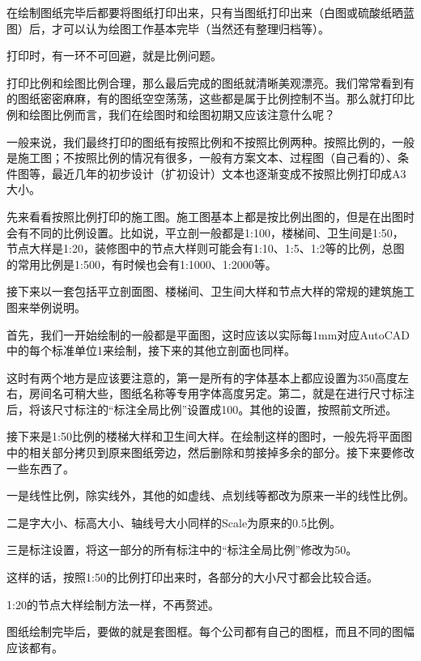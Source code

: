 在绘制图纸完毕后都要将图纸打印出来，只有当图纸打印出来（白图或硫酸纸晒蓝图）后，才可以认为绘图工作基本完毕（当然还有整理归档等）。

打印时，有一环不可回避，就是比例问题。

打印比例和绘图比例合理，那么最后完成的图纸就清晰美观漂亮。我们常常看到有的图纸密密麻麻，有的图纸空空荡荡，这些都是属于比例控制不当。那么就打印比例和绘图比例而言，我们在绘图时和绘图初期又应该注意什么呢？ 

一般来说，我们最终打印的图纸有按照比例和不按照比例两种。按照比例的，一般是施工图；不按照比例的情况有很多，一般有方案文本、过程图（自己看的）、条件图等，最近几年的初步设计（扩初设计）文本也逐渐变成不按照比例打印成A3大小。 

先来看看按照比例打印的施工图。施工图基本上都是按比例出图的，但是在出图时会有不同的比例设置。比如说，平立剖一般都是1:100，楼梯间、卫生间是1:50，节点大样是1:20，装修图中的节点大样则可能会有1:10、1:5、1:2等的比例，总图的常用比例是1:500，有时候也会有1:1000、1:2000等。

接下来以一套包括平立剖面图、楼梯间、卫生间大样和节点大样的常规的建筑施工图来举例说明。 

首先，我们一开始绘制的一般都是平面图，这时应该以实际每1mm对应AutoCAD中的每个标准单位1来绘制，接下来的其他立剖面也同样。

这时有两个地方是应该要注意的，第一是所有的字体基本上都应设置为350高度左右，房间名可稍大些，图纸名称等专用字体高度另定。第二，就是在进行尺寸标注后，将该尺寸标注的“标注全局比例”设置成100。其他的设置，按照前文所述。 

接下来是1:50比例的楼梯大样和卫生间大样。在绘制这样的图时，一般先将平面图中的相关部分拷贝到原来图纸旁边，然后删除和剪接掉多余的部分。接下来要修改一些东西了。

\begin{compactitem}
\item 一是线性比例，除实线外，其他的如虚线、点划线等都改为原来一半的线性比例。
\item 二是字大小、标高大小、轴线号大小同样的Scale为原来的0.5比例。
\item 三是标注设置，将这一部分的所有标注中的“标注全局比例”修改为50。
\end{compactitem}

这样的话，按照1:50的比例打印出来时，各部分的大小尺寸都会比较合适。 

1:20的节点大样绘制方法一样，不再赘述。 

图纸绘制完毕后，要做的就是套图框。每个公司都有自己的图框，而且不同的图幅应该都有。

